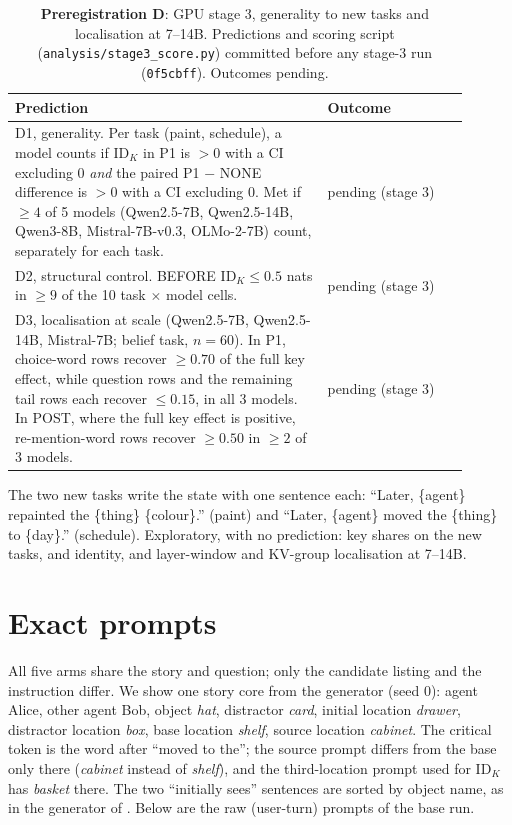 \begin{table}[h]
\centering
\small
\caption{\textbf{Preregistration D}: GPU stage 3, generality to new tasks and localisation at 7--14B. Predictions and scoring script (\texttt{analysis/stage3\_score.py}) committed before any stage-3 run (\texttt{0f5cbff}). Outcomes pending.}
\label{tab:prereg-d}
\begin{tabular}{p{0.62\linewidth}p{0.28\linewidth}}
\toprule
Prediction & Outcome \\
\midrule
D1, generality. Per task (paint, schedule), a model counts if $\mathrm{ID}_K$ in P1 is $> 0$ with a CI excluding 0 \emph{and} the paired P1 $-$ NONE difference is $> 0$ with a CI excluding 0. Met if $\geq 4$ of 5 models (Qwen2.5-7B, Qwen2.5-14B, Qwen3-8B, Mistral-7B-v0.3, OLMo-2-7B) count, separately for each task. & pending (stage 3) \\
D2, structural control. BEFORE $\mathrm{ID}_K \leq 0.5$ nats in $\geq 9$ of the 10 task $\times$ model cells. & pending (stage 3) \\
D3, localisation at scale (Qwen2.5-7B, Qwen2.5-14B, Mistral-7B; belief task, $n = 60$). In P1, choice-word rows recover $\geq 0.70$ of the full key effect, while question rows and the remaining tail rows each recover $\leq 0.15$, in all 3 models. In POST, where the full key effect is positive, re-mention-word rows recover $\geq 0.50$ in $\geq 2$ of 3 models. & pending (stage 3) \\
\bottomrule
\end{tabular}
\end{table}

The two new tasks write the state with one sentence each: ``Later, \{agent\} repainted the \{thing\} \{colour\}.'' (paint) and ``Later, \{agent\} moved the \{thing\} to \{day\}.'' (schedule). Exploratory, with no prediction: key shares on the new tasks, \fmtLetter{} and \fmtPost{} identity, and layer-window and KV-group localisation at 7--14B.

\section{Exact prompts}\label{app:prompts}

All five arms share the story and question; only the candidate listing and the instruction differ. We show one story core from the generator (seed 0): agent Alice, other agent Bob, object \emph{hat}, distractor \emph{card}, initial location \emph{drawer}, distractor location \emph{box}, base location \emph{shelf}, source location \emph{cabinet}. The critical token is the word after ``moved to the''; the source prompt differs from the base only there (\emph{cabinet} instead of \emph{shelf}), and the third-location prompt used for $\mathrm{ID}_K$ has \emph{basket} there. The two ``initially sees'' sentences are sorted by object name, as in the generator of \citet{anonymous2026fitted}. Below are the raw (user-turn) prompts of the base run.

